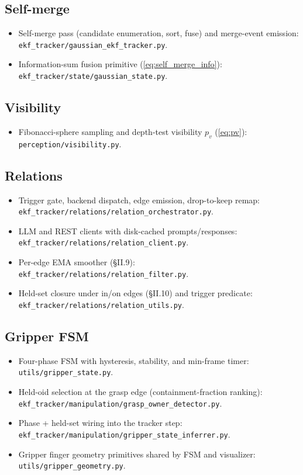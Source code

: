 \documentclass[11pt]{article}
\newcommand{\file}[1]{\texttt{#1}}
\begin{document}
\subsection*{Self-merge}
\begin{itemize}[leftmargin=1.5em,itemsep=0pt,topsep=2pt]
\item Self-merge pass (candidate enumeration, sort, fuse) and merge-event emission: \file{ekf\_tracker/gaussian\_ekf\_tracker.py}.
\item Information-sum fusion primitive (\eqref{eq:self_merge_info}): \file{ekf\_tracker/state/gaussian\_state.py}.
\end{itemize}

\subsection*{Visibility}
\begin{itemize}[leftmargin=1.5em,itemsep=0pt,topsep=2pt]
\item Fibonacci-sphere sampling and depth-test visibility $p_v$ (\eqref{eq:pv}): \file{perception/visibility.py}.
\end{itemize}

\subsection*{Relations}
\begin{itemize}[leftmargin=1.5em,itemsep=0pt,topsep=2pt]
\item Trigger gate, backend dispatch, edge emission, drop-to-keep remap: \file{ekf\_tracker/relations/relation\_orchestrator.py}.
\item LLM and REST clients with disk-cached prompts/responses: \file{ekf\_tracker/relations/relation\_client.py}.
\item Per-edge EMA smoother (\S II.9): \file{ekf\_tracker/relations/relation\_filter.py}.
\item Held-set closure under in/on edges (\S II.10) and trigger predicate: \file{ekf\_tracker/relations/relation\_utils.py}.
\end{itemize}

\subsection*{Gripper FSM}
\begin{itemize}[leftmargin=1.5em,itemsep=0pt,topsep=2pt]
\item Four-phase FSM with hysteresis, stability, and min-frame timer: \file{utils/gripper\_state.py}.
\item Held-oid selection at the grasp edge (containment-fraction ranking): \file{ekf\_tracker/manipulation/grasp\_owner\_detector.py}.
\item Phase + held-set wiring into the tracker step: \file{ekf\_tracker/manipulation/gripper\_state\_inferrer.py}.
\item Gripper finger geometry primitives shared by FSM and visualizer: \file{utils/gripper\_geometry.py}.
\end{itemize}
\end{document}
